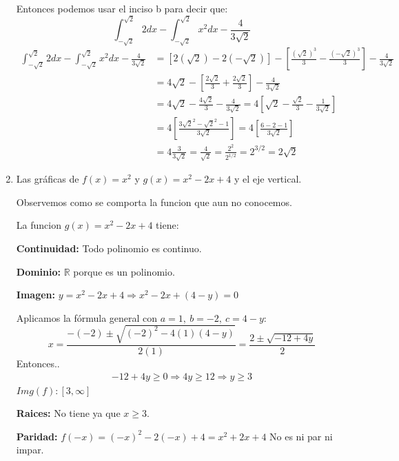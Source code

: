 \documentclass[12pt]{article}
\begin{document}
\begin{enumerate}[\hspace{9px} a)]
        Entonces podemos usar el inciso b para decir que: 
        \[\int_{-\sqrt{2}}^{\sqrt{2}}2dx-\int_{-\sqrt{2}}^{\sqrt{2}}x^2dx-\frac{4}{3\sqrt{2}}\]
        \begin{align}
            \int_{-\sqrt{2}}^{\sqrt{2}}2dx-\int_{-\sqrt{2}}^{\sqrt{2}}x^2dx-\frac{4}{3\sqrt{2}} &= [2(\sqrt{2})-2(-\sqrt{2})] - \left[\frac{(\sqrt{2})^3}{3}-\frac{(-\sqrt{2})^3}{3}\right]-\frac{4}{3\sqrt{2}}\\
            &= 4\sqrt{2}-\left[\frac{2\sqrt{2}}{3}+\frac{2\sqrt{2}}{3}\right]-\frac{4}{3\sqrt{2}}\\
            &= 4\sqrt{2}-\frac{4\sqrt{2}}{3}-\frac{4}{3\sqrt{2}} = 4\left[\sqrt{2}-\frac{\sqrt{2}}{3}-\frac{1}{3\sqrt{2}}\right]\\
            &= 4\left[\frac{3\sqrt{2}^2-\sqrt{2}^2-1}{3\sqrt{2}}\right] = 4\left[\frac{6-2-1}{3\sqrt{2}}\right]\\
            &= 4\frac{3}{3\sqrt{2}} = \frac{4}{\sqrt{2}} = \frac{2^2}{2^{1/2}} = 2^{3/2} = 2\sqrt{2}
        \end{align}

    \item Las gr\'aficas de \(f(x)=x^2\) y \(g(x)=x^2-2x+4\) y el eje vertical.\bigskip
    
        Observemos como se comporta la funcion que aun no conocemos.\medskip

        La funcion \(g(x) = x^2-2x+4\) tiene:\medskip

        \textbf{Continuidad: } Todo polinomio es continuo.\medskip

        \textbf{Dominio: }\(\mathbb{R}\) porque es un polinomio.\medskip

        \textbf{Imagen: } \(y = x^2-2x+4 \Longrightarrow x^2-2x+(4-y)=0\)\medskip

        Aplicamos la f\'ormula general con \(a=1, \ b=-2, \ c=4-y\):
        \begin{equation*}
            x=\frac{-(-2)\pm\sqrt{(-2)^2-4(1)(4-y)}}{2(1)} = \frac{2\pm\sqrt{-12+4y}}{2}
        \end{equation*}
        Entonces..
        \begin{align}
            -12+4y\geq0 \Longrightarrow 4y\geq12 \Longrightarrow y\geq3
        \end{align}
        \(Img(f): [3,\infty]\)\medskip

        \textbf{Raices: } No tiene ya que \(x\geq 3\).\medskip

        \textbf{Paridad: } \(f(-x)=(-x)^2-2(-x)+4=x^2+2x+4\) No es ni par ni impar.\medskip


\end{enumerate}
\end{document}
